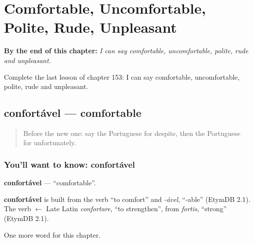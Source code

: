 
\chapter{Comfortable, Uncomfortable, Polite, Rude, Unpleasant}
\label{ch:pt-comfortable-uncomfortable-polite-rude-unpleasant}

\begin{chapteropening}
\textbf{By the end of this chapter:} \emph{I can say comfortable, uncomfortable, polite, rude and unpleasant.}

Complete the last lesson of chapter 153: I can say comfortable, uncomfortable, polite, rude and unpleasant.
\end{chapteropening}

\section[confortável]{confortável — comfortable}

\label{lesson:PT-C153-confortavel}



\begin{quote}
Before the new one: say the Portuguese for despite, then the Portuguese for unfortunately.
\end{quote}

\subsection*{You'll want to know: confortável}
\textbf{confortável} — \textquotedblleft{}comfortable\textquotedblright{}.

\begin{cousinweb}
\textbf{confortável} is built from the verb \textquotedblleft{}to comfort\textquotedblright{} and \emph{-ável}, \textquotedblleft{}-able\textquotedblright{} (EtymDB 2.1). The verb $\leftarrow$ Late Latin \emph{confortare}, \textquotedblleft{}to strengthen\textquotedblright{}, from \emph{fortis}, \textquotedblleft{}strong\textquotedblright{} (EtymDB 2.1).
\end{cousinweb}

\begin{grammarlens}[title={What you've built}]
One more word for this chapter.
\end{grammarlens}

